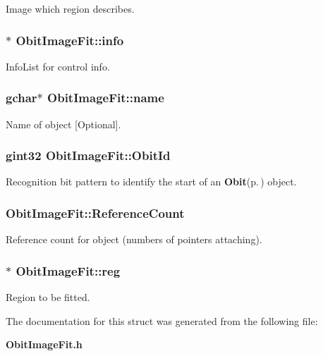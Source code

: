 Image which region describes. 

\subsubsection{$\ast$ {\bf Obit\-Image\-Fit::info}}\label{structObitImageFit_o4}


Info\-List for control info. 

\subsubsection{\setlength{\rightskip}{0pt plus 5cm}gchar$\ast$ {\bf Obit\-Image\-Fit::name}}\label{structObitImageFit_o3}


Name of object [Optional]. 

\subsubsection{\setlength{\rightskip}{0pt plus 5cm}gint32 {\bf Obit\-Image\-Fit::Obit\-Id}}\label{structObitImageFit_o0}


Recognition bit pattern to identify the start of an {\bf Obit}{\rm (p.\,\pageref{structObit})} object. 

\subsubsection{ {\bf Obit\-Image\-Fit::Reference\-Count}}\label{structObitImageFit_o2}


Reference count for object (numbers of pointers attaching). 

\subsubsection{$\ast$ {\bf Obit\-Image\-Fit::reg}}\label{structObitImageFit_o6}


Region to be fitted. 



The documentation for this struct was generated from the following file:\begin{CompactItemize}
\item 
{\bf Obit\-Image\-Fit.h}\end{CompactItemize}
